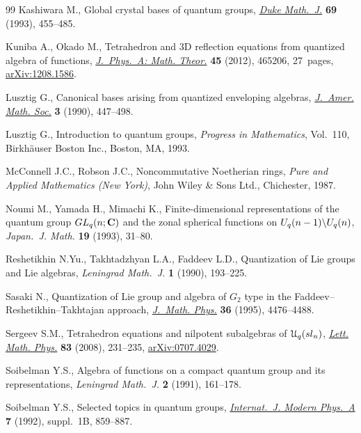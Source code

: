 \documentclass[11pt]{article}
\begin{document}
\begin{thebibliography}{99}
Kashiwara M., Global crystal bases of quantum groups, \href{http://dx.doi.org/10.1215/S0012-7094-93-06920-7}{\textit{Duke Math.~J.}}
  \textbf{69} (1993), 455--485.

Kuniba A., Okado M., Tetrahedron and 3{D} ref\/lection equations from quantized
  algebra of functions, \href{http://dx.doi.org/10.1088/1751-8113/45/46/465206}{\textit{J.~Phys.~A: Math. Theor.}} \textbf{45} (2012),
  465206, 27~pages, \href{http://arxiv.org/abs/1208.1586}{arXiv:1208.1586}.

Lusztig G., Canonical bases arising from quantized enveloping algebras,
  \href{http://dx.doi.org/10.2307/1990961}{\textit{J.~Amer. Math. Soc.}} \textbf{3} (1990), 447--498.

Lusztig G., Introduction to quantum groups, \textit{Progress in Mathematics},
  Vol.~110, Birkh\"auser Boston Inc., Boston, MA, 1993.

McConnell J.C., Robson J.C., Noncommutative {N}oetherian rings, \textit{Pure and
  Applied Mathematics (New York)}, John Wiley \& Sons Ltd., Chichester, 1987.

Noumi M., Yamada H., Mimachi K., Finite-dimensional representations of the
  quantum group {${\rm GL}_q(n;{\bf C})$} and the zonal spherical functions on
  {${\rm U}_q(n-1)\backslash{\rm U}_q(n)$}, \textit{Japan.~J. Math.}
  \textbf{19} (1993), 31--80.

Reshetikhin N.Yu., Takhtadzhyan L.A., Faddeev L.D., Quantization of {L}ie groups
  and {L}ie algebras, \textit{Leningrad Math.~J.} \textbf{1} (1990), 193--225.

Sasaki N., Quantization of {L}ie group and algebra of {$G_2$} type in the
  {F}addeev--{R}eshetikhin--{T}akhtajan approach, \href{http://dx.doi.org/10.1063/1.531350}{\textit{J.~Math. Phys.}}
  \textbf{36} (1995), 4476--4488.

Sergeev S.M., Tetrahedron equations and nilpotent subalgebras of {${\mathcal
  U}_q({\rm sl}_n)$}, \href{http://dx.doi.org/10.1007/s11005-008-0219-x}{\textit{Lett. Math. Phys.}} \textbf{83} (2008), 231--235,
  \href{http://arxiv.org/abs/0707.4029}{arXiv:0707.4029}.

Soibelman Y.S., Algebra of functions on a compact quantum group and its
  representations, \textit{Leningrad Math.~J.} \textbf{2} (1991), 161--178.

Soibelman Y.S., Selected topics in quantum groups, \href{http://dx.doi.org/10.1142/S0217751X92004087}{\textit{Internat.~J. Modern
  Phys.~A}} \textbf{7} (1992), suppl.~1B, 859--887.


\end{thebibliography}
\end{document}
